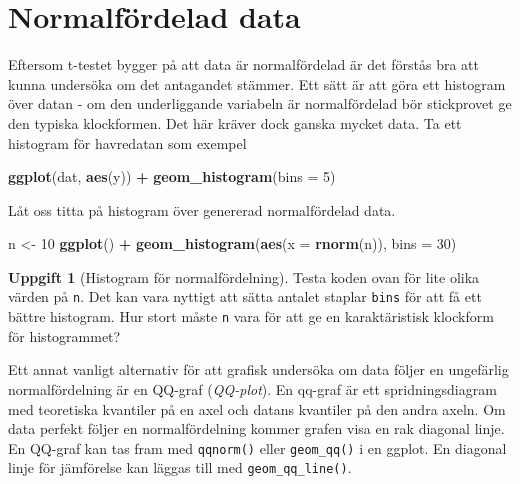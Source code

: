 \documentclass[
]{book}
\newenvironment{Shaded}{\begin{snugshade}}{\end{snugshade}}
\newcommand{\AttributeTok}[1]{\textcolor[rgb]{0.13,0.29,0.53}{#1}}
\newcommand{\DecValTok}[1]{\textcolor[rgb]{0.00,0.00,0.81}{#1}}
\newcommand{\FunctionTok}[1]{\textcolor[rgb]{0.13,0.29,0.53}{\textbf{#1}}}
\newcommand{\NormalTok}[1]{#1}
\newcommand{\OtherTok}[1]{\textcolor[rgb]{0.56,0.35,0.01}{#1}}
\newcommand{\SpecialCharTok}[1]{\textcolor[rgb]{0.81,0.36,0.00}{\textbf{#1}}}
\theoremstyle{definition}
\theoremstyle{definition}
\theoremstyle{definition}
\newtheorem{exercise}{Uppgift}[chapter]
\theoremstyle{definition}
\theoremstyle{remark}
\begin{document}
\section{Normalfördelad data}\label{normalfuxf6rdelad-data}

Eftersom t-testet bygger på att data är normalfördelad är det förstås bra att kunna undersöka om det antagandet stämmer. Ett sätt är att göra ett histogram över datan - om den underliggande variabeln är normalfördelad bör stickprovet ge den typiska klockformen. Det här kräver dock ganska mycket data. Ta ett histogram för havredatan som exempel

\begin{Shaded}
\begin{Highlighting}[]
\FunctionTok{ggplot}\NormalTok{(dat, }\FunctionTok{aes}\NormalTok{(y)) }\SpecialCharTok{+} \FunctionTok{geom\_histogram}\NormalTok{(}\AttributeTok{bins =} \DecValTok{5}\NormalTok{)}
\end{Highlighting}
\end{Shaded}

Låt oss titta på histogram över genererad normalfördelad data.

\begin{Shaded}
\begin{Highlighting}[]
\NormalTok{n }\OtherTok{\textless{}{-}} \DecValTok{10}
\FunctionTok{ggplot}\NormalTok{() }\SpecialCharTok{+} \FunctionTok{geom\_histogram}\NormalTok{(}\FunctionTok{aes}\NormalTok{(}\AttributeTok{x =} \FunctionTok{rnorm}\NormalTok{(n)), }\AttributeTok{bins =} \DecValTok{30}\NormalTok{)}
\end{Highlighting}
\end{Shaded}

\begin{exercise}[Histogram för normalfördelning]
Testa koden ovan för lite olika värden på \texttt{n}. Det kan vara nyttigt att sätta antalet staplar \texttt{bins} för att få ett bättre histogram. Hur stort måste \texttt{n} vara för att ge en karaktäristisk klockform för histogrammet?
\end{exercise}

Ett annat vanligt alternativ för att grafisk undersöka om data följer en ungefärlig normalfördelning är en QQ-graf (\emph{QQ-plot}). En qq-graf är ett spridningsdiagram med teoretiska kvantiler på en axel och datans kvantiler på den andra axeln. Om data perfekt följer en normalfördelning kommer grafen visa en rak diagonal linje. En QQ-graf kan tas fram med \texttt{qqnorm()} eller \texttt{geom\_qq()} i en ggplot. En diagonal linje för jämförelse kan läggas till med \texttt{geom\_qq\_line()}.
\end{document}
